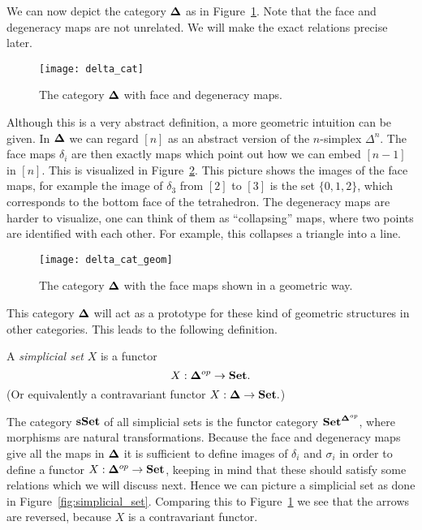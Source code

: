 We can now depict the category $\mathbf{\Delta}$ as in Figure~\ref{fig:delta_cat}. Note that the face and degeneracy maps are not unrelated. We will make the exact relations precise later.

\begin{figure}[h!]
	\texttt{[image: delta\_cat]}
	\caption{The category $\mathbf{\Delta}$ with face and degeneracy maps.}
	\label{fig:delta_cat}
\end{figure}

Although this is a very abstract definition, a more geometric intuition can be given. In $\mathbf{\Delta}$ we can regard $[n]$ as an abstract version of the $n$-simplex $\Delta^n$. The face maps $\delta_i$ are then exactly maps which point out how we can embed $[n-1]$ in $[n]$. This is visualized in Figure~\ref{fig:delta_cat_geom}. This picture shows the images of the face maps, for example the image of $\delta_3$ from $[2]$ to $[3]$ is the set $\{0,1,2\}$, which corresponds to the bottom face of the tetrahedron. The degeneracy maps are harder to visualize, one can think of them as ``collapsing'' maps, where two points are identified with each other. For example, this collapses a triangle into a line.

\begin{figure}
	\texttt{[image: delta\_cat\_geom]}
	\caption{The category $\mathbf{\Delta}$ with the face maps shown in a geometric way.}
	\label{fig:delta_cat_geom}
\end{figure}

This category $\mathbf{\Delta}$ will act as a prototype for these kind of geometric structures in other categories. This leads to the following definition.

\begin{definition}
	A \emph{simplicial set} $X$ is a functor
	$$X: \mathbf{\Delta}^{op} \to \mathbf{Set}.$$
	(Or equivalently a contravariant functor $X: \mathbf{\Delta} \to \mathbf{Set}.$)
\end{definition}

The category $\mathbf{sSet}$ of all simplicial sets is the functor category $\mathbf{Set}^{\mathbf{\Delta}^{op}}$, where morphisms are natural transformations. Because the face and degeneracy maps give all the maps in $\mathbf{\Delta}$ it is sufficient to define images of $\delta_i$ and $\sigma_i$ in order to define a functor $X: \mathbf{\Delta}^{op} \to \mathbf{Set}$, keeping in mind that these should satisfy some relations which we will discuss next. Hence we can picture a simplicial set as done in Figure~\ref{fig:simplicial_set}. Comparing this to Figure~\ref{fig:delta_cat} we see that the arrows are reversed, because $X$ is a contravariant functor.

